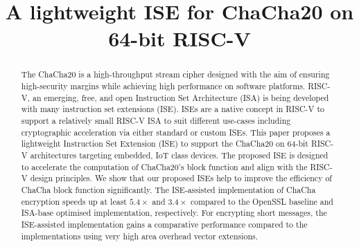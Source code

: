 \documentclass[sigconf]{acmart}
\begin{document}

\title{A lightweight ISE for ChaCha20 on 64-bit RISC-V}
%

%

\begin{abstract}
The ChaCha20 is a high-throughput stream cipher designed with the aim of ensuring high-security margins while achieving high performance on software platforms. RISC-V, an emerging, free, and open Instruction Set Architecture (ISA) is being developed with many instruction set extensions (ISE). ISEs are a native concept in RISC-V to support a relatively small RISC-V ISA to suit different use-cases including cryptographic acceleration via either standard or custom ISEs. This paper proposes a lightweight Instruction Set Extension (ISE) to support the ChaCha20 on 64-bit RISC-V architectures targeting embedded, IoT class devices. The proposed ISE is designed to accelerate the computation of ChaCha20's block function and align with the  RISC-V design principles. We show that our proposed ISEs help to improve the efficiency of ChaCha block function significantly. 
The ISE-assisted implementation of ChaCha encryption speeds up at least $5.4\times$ and $3.4\times$ compared to the OpenSSL baseline and ISA-base optimised implementation, respectively. 
For encrypting short messages, the ISE-assisted implementation gains a comparative performance compared to the implementations using very high area overhead vector extensions.
\end{abstract}
\end{document}
